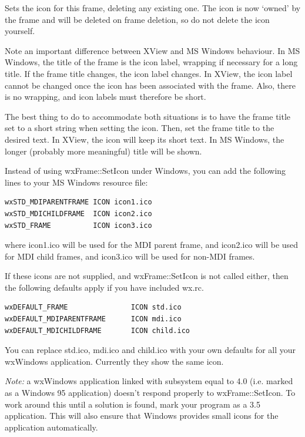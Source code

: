
Sets the icon for this frame, deleting any existing one. The icon
is now `owned' by the frame and will be deleted on frame deletion,
so do not delete the icon yourself.

Note an important difference between XView and MS Windows behaviour. In
MS Windows, the title of the frame is the icon label, wrapping if
necessary for a long title. If the frame title changes, the icon label
changes. In XView, the icon label cannot be changed once the icon has
been associated with the frame.  Also, there is no wrapping, and icon
labels must therefore be short.

The best thing to do to accommodate both situations is to have the frame
title set to a short string when setting the icon. Then, set the frame
title to the desired text. In XView, the icon will keep its short text.
In MS Windows, the longer (probably more meaningful) title will be
shown.

Instead of using wxFrame::SetIcon under Windows, you can add the
following lines to your MS Windows resource file:

\begin{verbatim}
wxSTD_MDIPARENTFRAME ICON icon1.ico
wxSTD_MDICHILDFRAME  ICON icon2.ico
wxSTD_FRAME          ICON icon3.ico
\end{verbatim}

where icon1.ico will be used for the MDI parent frame, and icon2.ico
will be used for MDI child frames, and icon3.ico will be used for
non-MDI frames.

If these icons are not supplied, and wxFrame::SetIcon is not called either,
then the following defaults apply if you have included wx.rc.

\begin{verbatim}
wxDEFAULT_FRAME               ICON std.ico
wxDEFAULT_MDIPARENTFRAME      ICON mdi.ico
wxDEFAULT_MDICHILDFRAME       ICON child.ico
\end{verbatim}

You can replace std.ico, mdi.ico and child.ico with your own defaults
for all your wxWindows application. Currently they show the same icon.

{\it Note:} a wxWindows application linked with subsystem equal to 4.0
(i.e. marked as a Windows 95 application) doesn't respond properly
to wxFrame::SetIcon. To work around this until a solution is found,
mark your program as a 3.5 application. This will also ensure
that Windows provides small icons for the application automatically.

